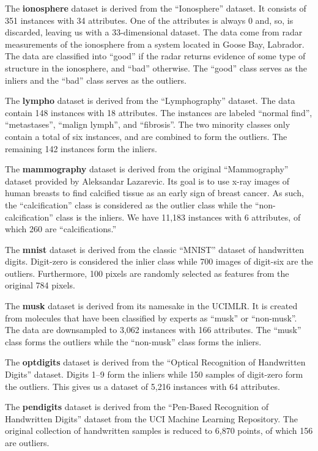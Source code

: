 The \textbf{ionosphere} dataset is derived from the ``Ionosphere'' dataset.
It consists of 351 instances with 34 attributes.
One of the attributes is always 0 and, so, is discarded, leaving us with a 33-dimensional dataset.
The data come from radar measurements of the ionosphere from a system located in Goose Bay, Labrador.
The data are classified into ``good'' if the radar returns evidence of some type of structure in the ionosphere, and ``bad'' otherwise.
The ``good'' class serves as the inliers and the ``bad'' class serves as the outliers.

The \textbf{lympho} dataset is derived from the ``Lymphography'' dataset.
The data contain 148 instances with 18 attributes.
The instances are labeled ``normal find'', ``metastases'', ``malign lymph'', and ``fibrosis''.
The two minority classes only contain a total of six instances, and are combined to form the outliers.
The remaining 142 instances form the inliers.

The \textbf{mammography} dataset is derived from the original ``Mammography'' dataset provided by Aleksandar Lazarevic.
Its goal is to use x-ray images of human breasts to find calcified tissue as an early sign of breast cancer.
As such, the ``calcification'' class is considered as the outlier class while the ``non-calcification'' class is the inliers.
We have 11,183 instances with 6 attributes, of which 260 are ``calcifications.''

The \textbf{mnist} dataset is derived from the classic ``MNIST'' dataset of handwritten digits.
Digit-zero is considered the inlier class while 700 images of digit-six are the outliers.
Furthermore, 100 pixels are randomly selected as features from the original 784 pixels.

The \textbf{musk} dataset is derived from its namesake in the UCIMLR\@.
It is created from molecules that have been classified by experts as ``musk'' or ``non-musk''.
The data are downsampled to 3,062 instances with 166 attributes.
The ``musk'' class forms the outliers while the ``non-musk'' class forms the inliers.

The \textbf{optdigits} dataset is derived from the ``Optical Recognition of Handwritten Digits'' dataset.
Digits 1--9 form the inliers while 150 samples of digit-zero form the outliers.
This gives us a dataset of 5,216 instances with 64 attributes.

The \textbf{pendigits} dataset is derived from the ``Pen-Based Recognition of Handwritten Digits'' dataset from the UCI Machine Learning Repository.
The original collection of handwritten samples is reduced to 6,870 points, of which 156 are outliers.

